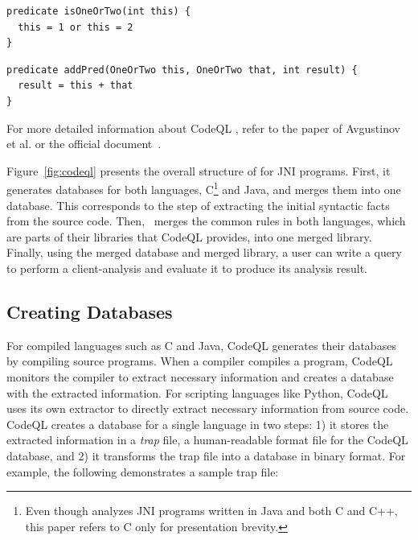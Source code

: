\begin{lstlisting}[style=codeql,xleftmargin=2.5em]
predicate isOneOrTwo(int this) {
  this = 1 or this = 2
}
\end{lstlisting}
\begin{lstlisting}[style=codeql,xleftmargin=2.5em]
predicate addPred(OneOrTwo this, OneOrTwo that, int result) {
  result = this + that
}
\end{lstlisting}
For more detailed information about CodeQL , refer to the paper of Avgustinov et
al.\cite{ql2016} or the official document~\cite{codeql}.

Figure~\ref{fig:codeql} presents the overall structure of \ours for JNI
programs.  First, it generates databases for both languages, C\footnote{ Even
though \ours analyzes JNI programs written in Java and both C and C++, this
paper refers to C only for presentation brevity.} and Java, and merges them
into one database.  This corresponds to the step of extracting the initial
syntactic facts from the source code.  Then, \ours~merges the common rules in
both languages, which are parts of their libraries that CodeQL provides, into
one merged library.  Finally, using the merged database and merged library, a
user can write a query to perform a client-analysis and evaluate it to produce
its analysis result.

\subsection{Creating Databases}
For compiled languages such as C and Java, CodeQL generates their databases by
compiling source programs.  When a compiler compiles a program, CodeQL monitors
the compiler to extract necessary information and creates a database with the
extracted information. For scripting languages like Python, CodeQL uses its own
extractor to directly extract necessary information from source code.  CodeQL
creates a database for a single language in two steps: 1) it stores the
extracted information in a  \textit{trap} file, a human-readable format file for
the CodeQL database, and 2) it transforms the trap file into a database in
binary format.  For example, the following demonstrates a sample trap file:

